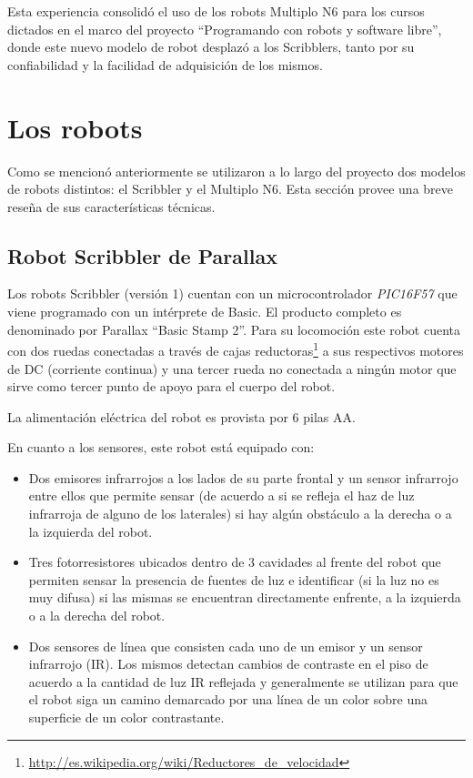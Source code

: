 Esta experiencia consolidó el uso de
los robots Multiplo N6 para los cursos dictados en el marco del proyecto
``Programando con robots y software libre'',  donde este nuevo modelo de  robot desplazó
a los Scribblers, tanto por su confiabilidad y la facilidad de adquisición de los mismos.



\section{Los robots}
Como se mencionó anteriormente se utilizaron a lo largo del proyecto dos
modelos de robots distintos: el  Scribbler y el Multiplo N6. Esta sección provee una
breve reseña de sus características técnicas.

\subsection{Robot Scribbler de Parallax}
Los robots Scribbler (versión 1) cuentan con un microcontrolador
\textit{PIC16F57} que viene programado con un intérprete de Basic. El producto
completo es denominado por Parallax ``Basic Stamp 2''.
Para su locomoción este robot cuenta con dos ruedas conectadas a través de
cajas
reductoras\footnote{\url{http://es.wikipedia.org/wiki/Reductores_de_velocidad}}
a sus respectivos motores de DC (corriente continua)  y una tercer rueda no conectada a ningún
motor que sirve como tercer punto de apoyo para el cuerpo del robot.

La alimentación eléctrica del robot es provista por 6 pilas AA.

En cuanto a los sensores, este robot está equipado con:
\begin{itemize}
    \item Dos emisores infrarrojos a los lados de su parte frontal y un
        sensor infrarrojo entre ellos que permite sensar (de acuerdo a si se
        refleja el haz de luz infrarroja de alguno de los laterales) si
        hay algún obstáculo a la derecha o a la izquierda del robot.
    \item Tres fotorresistores ubicados dentro de 3 cavidades al frente del
        robot que permiten sensar la presencia de fuentes de luz e
        identificar (si la luz no es muy difusa) si las mismas se encuentran
        directamente enfrente, a la izquierda o a la derecha del robot.
    \item Dos sensores de línea que consisten cada uno de un emisor
        y un sensor infrarrojo (IR). Los mismos detectan cambios de contraste
        en el piso de acuerdo a la cantidad de luz IR reflejada y generalmente
        se utilizan para que el robot siga un camino demarcado por una línea
        de un color sobre una superficie de un color contrastante.
\end{itemize}

